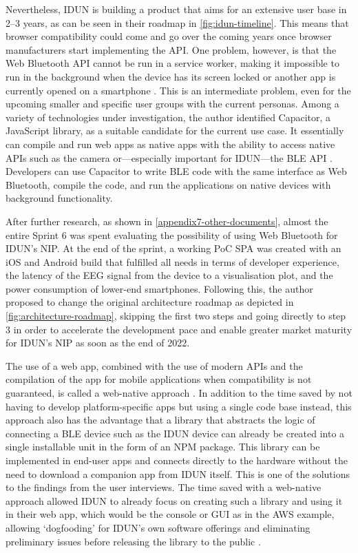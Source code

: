 Nevertheless, IDUN is building a product that aims for an extensive user base in 2–3 years, as can be seen in their roadmap in \autoref{fig:idun-timeline}. This means that browser compatibility could come and go over the coming years once browser manufacturers start implementing the API. One problem, however, is that the Web Bluetooth API cannot be run in a service worker, making it impossible to run in the background when the device has its screen locked or another app is currently opened on a smartphone  \citep{webbluetoothcg_service_2018}. This is an intermediate problem, even for the upcoming smaller and specific user groups with the current personas. Among a variety of technologies under investigation, the author identified Capacitor, a JavaScript library, as a suitable candidate for the current use case. It essentially can compile and run web apps as native apps with the ability to access native APIs \citep{ionic_capacitor_nodate}such as the camera or—especially important for IDUN—the BLE API \citep{capacitor-community_capacitor-communitybluetooth-_2022}. Developers can use Capacitor to write BLE code with the same interface as Web Bluetooth, compile the code, and run the applications on native devices with background functionality.

After further research, as shown in \autoref{appendix7-other-documents}, almost the entire Sprint 6 was spent evaluating the possibility of using Web Bluetooth for IDUN’s NIP. At the end of the sprint, a working PoC SPA was created with an iOS and Android build that fulfilled all needs in terms of developer experience, the latency of the EEG signal from the device to a visualisation plot, and the power consumption of lower-end smartphones. Following this, the author proposed to change the original architecture roadmap as depicted in \autoref{fig:architecture-roadmap}, skipping the first two steps and going directly to step 3 in order to accelerate the development pace and enable greater market maturity for IDUN’s NIP as soon as the end of 2022.

The use of a web app, combined with the use of modern APIs and the compilation of the app for mobile applications when compatibility is not guaranteed, is called a web-native approach \citep{ionic_web_nodate}. In addition to the time saved by not having to develop platform-specific apps but using a single code base instead, this approach also has the advantage that a library that abstracts the logic of connecting a BLE device such as the IDUN device can already be created into a single installable unit in the form of an NPM package. This library can be implemented in end-user apps and connects directly to the hardware without the need to download a companion app from IDUN itself. This is one of the solutions to the findings from the user interviews. The time saved with a web-native approach allowed IDUN to already focus on creating such a library and using it in their web app, which would be the console or GUI as in the AWS example, allowing ‘dogfooding’ for IDUN’s own software offerings and eliminating preliminary issues before releasing the library to the public \citep{techopedia_what_2016}.

